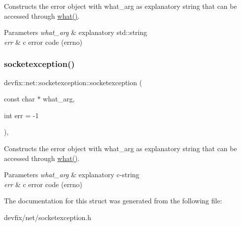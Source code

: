 Constructs the error object with what\+\_\+arg as explanatory string that can be accessed through \hyperlink{structdevfix_1_1base_1_1error_1_1baseexception_a16327152a55d65b1e537825231fbd452}{what()}. 
\begin{DoxyParams}{Parameters}
{\em what\+\_\+arg} & explanatory std\+::string \\
\hline
{\em err} & c error code (errno) \\
\hline
\end{DoxyParams}
\mbox{\label{structdevfix_1_1net_1_1socketexception_a6da69f635eb11f932a0e960545d023bd}} 
\subsubsection{\texorpdfstring{socketexception()}{socketexception()}\hspace{0.1cm}{\footnotesize\ttfamily [2/2]}}
{\footnotesize\ttfamily devfix\+::net\+::socketexception\+::socketexception (\begin{DoxyParamCaption}\item[{const char $\ast$}]{what\+\_\+arg,  }\item[{int}]{err = {\ttfamily -\/1} }\end{DoxyParamCaption})\hspace{0.3cm}{\ttfamily [inline]}, {\ttfamily [explicit]}}

Constructs the error object with what\+\_\+arg as explanatory string that can be accessed through \hyperlink{structdevfix_1_1base_1_1error_1_1baseexception_a16327152a55d65b1e537825231fbd452}{what()}. 
\begin{DoxyParams}{Parameters}
{\em what\+\_\+arg} & explanatory c-\/string \\
\hline
{\em err} & c error code (errno) \\
\hline
\end{DoxyParams}


The documentation for this struct was generated from the following file\+:\begin{DoxyCompactItemize}
\item 
devfix/net/socketexception.\+h\end{DoxyCompactItemize}
